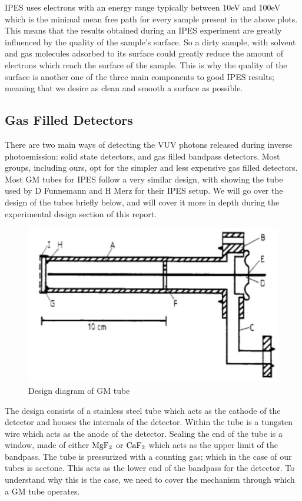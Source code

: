 IPES uses electrons with an energy range typically between 10eV and 100eV which is the minimal mean free path for every sample present in the above plots. This means that the results
obtained during an IPES experiment are greatly influenced by the quality of the sample's surface. So a dirty sample, with solvent and gas molecules adsorbed to its surface 
could greatly reduce the amount of electrons which reach the surface of the sample. This is why the quality of the surface is another one of the three main components to good IPES 
results; meaning that we desire as clean and smooth a surface as possible. 

\subsection{Gas Filled Detectors}
There are two main ways of detecting the VUV photons released during inverse photoemission\cite{stiepel2005vacuum}: solid state detectors, and gas filled bandpass detectors. Most groups, including ours, opt
for the simpler and less expensive gas filled detectors. Most GM tubes for IPES follow a very similar design, with  showing the tube used by D Funnemann and H Merz
for their IPES setup. We will go over the design of the tubes briefly below, and will cover it more in depth during the experimental design section of this report. 

\begin{figure}[h!]
    \centering
    \includegraphics[scale=0.5]{Figs/tubedesign.png}
    \caption{Design diagram of GM tube\cite{funnemann198610}}
    \label{fig:TubeDesign}
\end{figure}

The design consists of a stainless steel tube which acts as the cathode of the detector and houses the internals of the detector. Within the tube is a tungsten wire which acts as the 
anode of the detector. Sealing the end of the tube is a window, made of either $\ce{MgF2}$ or $\ce{CaF2}$ which acts as the upper limit of the bandpass. The tube is pressurized with 
a counting gas; which in the case of our tubes is acetone. This acts as the lower end of the bandpass for the detector. To understand why this is the case, we need to cover the 
mechanism through which a GM tube operates. 


